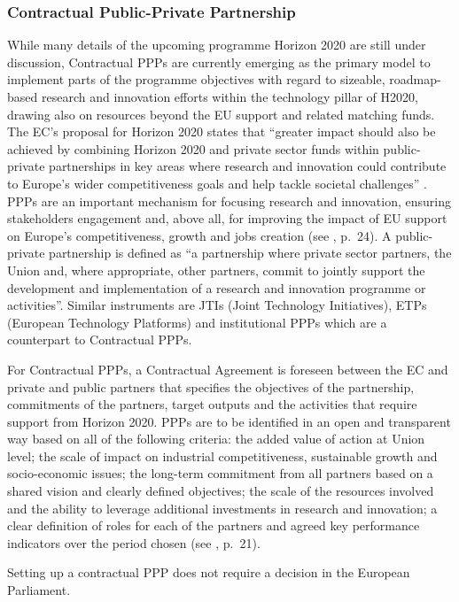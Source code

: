 \documentclass[10pt, plain]{../../metanetpaper}
\begin{document}
\begin{multicols}{2}
\subsubsection{Contractual Public-Private Partnership}
\label{sec:contr-ppp}

While many details of the upcoming programme Horizon 2020 are still under discussion, Contractual PPPs are currently emerging as the primary model to implement parts of the programme objectives with regard to sizeable, roadmap-based research and innovation efforts within the technology pillar of H2020, drawing also on resources beyond the EU support and related matching funds. The EC's proposal for Horizon 2020 states that ``greater impact should also be achieved by combining Horizon 2020 and private sector funds within public-private partnerships in key areas where research and innovation could contribute to Europe's wider competitiveness goals and help tackle societal challenges'' \cite{H2020prop}.  PPPs are an important mechanism for focusing research and innovation, ensuring stakeholders engagement and, above all, for improving the impact of EU support on Europe's competitiveness, growth and jobs creation (see \cite{DA2010}, p.~24). A public-private partnership is defined as ``a partnership where private sector partners, the Union and, where appropriate, other partners, commit to jointly support the development and implementation of a research and innovation programme or activities''. Similar instruments are JTIs (Joint Technology Initiatives), ETPs (European Technology Platforms) and institutional PPPs which are a counterpart to Contractual PPPs.

For Contractual PPPs, a Contractual Agreement is foreseen between the EC and private and public partners that specifies the objectives of the partnership, commitments of the partners, target outputs and the activities that require support from Horizon 2020. PPPs are to be identified in an open and transparent way based on all of the following criteria: the added value of action at Union level; the scale of impact on industrial competitiveness, sustainable growth and socio-economic issues; the long-term commitment from all partners based on a shared vision and clearly defined objectives; the scale of the resources involved and the ability to leverage additional investments in research and innovation; a clear definition of roles for each of the partners and agreed key performance indicators over the period chosen (see \cite{H2020prop}, p.~21). 

Setting up a contractual PPP does not require a decision in the European Parliament.  


\end{multicols}
\end{document}
